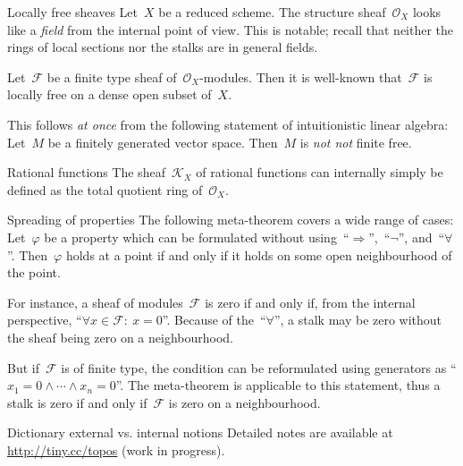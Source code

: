 \documentclass[table]{beamer}
\newcommand{\F}{\mathcal{F}}
\renewcommand{\O}{\mathcal{O}}
\newcommand{\K}{\mathcal{K}}
\begin{document}
\begin{frame}[t]
\begin{columns}[t]
\begin{column}{0.3\textwidth}
  \begin{block}{Locally free sheaves}
    Let~$X$ be a reduced scheme. The structure sheaf~$\O_X$ looks like a \emph{field} from the
    internal point of view. This is notable; recall that neither the rings of
    local sections nor the stalks are in general fields.\medskip

    Let~$\F$ be a finite type sheaf of~$\O_X$-modules. 
    Then it is well-known that~$\F$ is locally free on a dense open subset
    of~$X$.\medskip

    This follows \emph{at once} from the following statement of intuitionistic
    linear algebra: Let~$M$ be a finitely generated vector space. Then~$M$ is
    \emph{not not} finite free.
  \end{block}
  \bigskip

  \begin{block}{Rational functions}
    The sheaf~$\K_X$ of rational functions can internally simply be defined as
    the total quotient ring of~$\O_X$.
  \end{block}
  \bigskip

  \begin{block}{Spreading of properties}
    The following meta-theorem covers a wide range of cases:
    Let~$\varphi$ be a property which can be formulated without
    using~``$\Rightarrow$'',~``$\neg$'', and~``$\forall$''. Then~$\varphi$
    holds at a point if and only if it holds on some open neighbourhood of the
    point.\medskip

    For instance, a sheaf of modules~$\F$ is zero if and only if, from the
    internal perspective, ``$\forall x \in \F{:}\ x = 0$''. Because of
    the~``$\forall$'', a stalk may be zero without the sheaf being zero on a
    neighbourhood.\medskip

    But if~$\F$ is of finite type, the condition can be reformulated using
    generators as ``$x_1 = 0 \wedge \cdots \wedge x_n = 0$''. The meta-theorem
    is applicable to this statement, thus a stalk is zero if and only if~$\F$
    is zero on a neighbourhood.
  \end{block}

  \vspace{1cm}
  \begin{alertblock}{Dictionary external vs. internal notions}
    Detailed notes are available at \url{http://tiny.cc/topos} (work in
    progress).
  \end{alertblock}
\end{column}

\end{columns}\end{frame}
\end{document}
